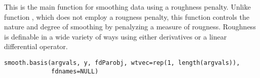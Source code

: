 \documentclass{article}
\begin{document}
\begin{Description}\relax
This is the main function for smoothing data using a roughness
penalty.  Unlike function , which does not employ a
rougness penalty, this function controls the nature and degree of
smoothing by penalyzing a measure of rougness.  Roughness is definable
in a wide variety of ways using either derivatives or a linear
differential operator.
\end{Description}
\begin{Usage}
\begin{verbatim}
smooth.basis(argvals, y, fdParobj, wtvec=rep(1, length(argvals)),
             fdnames=NULL)
\end{verbatim}
\end{Usage}
\end{document}
